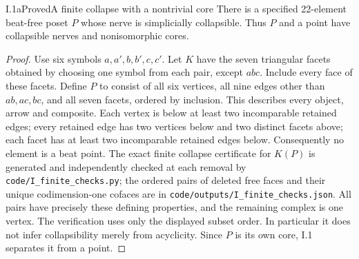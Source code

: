 \begin{claim}{I.1a}{Proved}{A finite collapse with a nontrivial core}
There is a specified 22-element beat-free poset $P$ whose nerve is
simplicially collapsible. Thus $P$ and a point have collapsible nerves
and nonisomorphic cores.
\end{claim}
\begin{proof}
Use six symbols $a,a',b,b',c,c'$. Let $K$ have the seven triangular
facets obtained by choosing one symbol from each pair, except $abc$.
Include every face of these facets. Define $P$ to consist of all six
vertices, all nine edges other than $ab,ac,bc$, and all seven facets,
ordered by inclusion. This describes every object, arrow and composite.
Each vertex is below at least two incomparable retained edges; every
retained edge has two vertices below and two distinct facets above; each
facet has at least two incomparable retained edges below. Consequently
no element is a beat point. The exact finite collapse certificate for
$K(P)$ is generated and independently checked at each removal by
\texttt{code/I\_finite\_checks.py}; the ordered pairs of deleted free
faces and their unique codimension-one cofaces are in
\texttt{code/outputs/I\_finite\_checks.json}. All pairs have precisely
these defining properties, and the remaining complex is one vertex.
The verification uses only the displayed subset order. In particular
it does not infer collapsibility merely from acyclicity. Since $P$ is
its own core, I.1 separates it from a point.
\end{proof}

